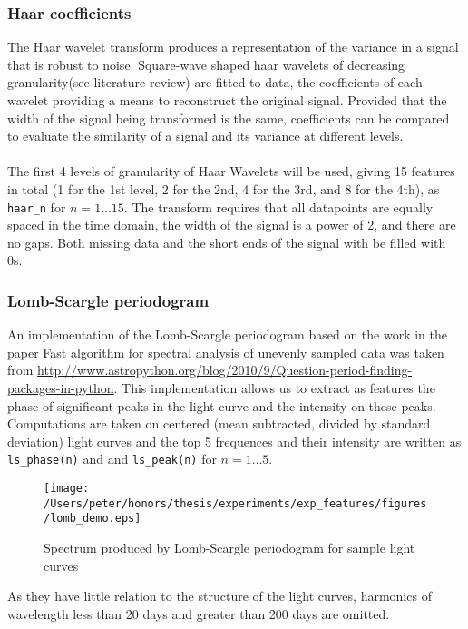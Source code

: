 	\subsubsection{Haar coefficients}
	The Haar wavelet transform produces a representation of the variance in a signal that is robust to noise. Square-wave shaped haar wavelets of decreasing granularity(see literature review) are fitted to data, the coefficients of each wavelet providing a means to reconstruct the original signal. Provided that the width of the signal being transformed is the same, coefficients can be compared to evaluate the similarity of a signal and its variance at different levels. \\ \\ %
	The first 4 levels of granularity of Haar Wavelets will be used, giving 15 features in total (1 for the 1st level, 2 for the 2nd, 4 for the 3rd, and 8 for the 4th), as \verb#haar_n# for $n = 1 \ldots 15$. The transform requires that all datapoints are equally spaced in the time domain, the width of the signal is a power of 2, and there are no gaps. Both missing data and the short ends of the signal with be filled with 0s.
	
	\subsubsection{Lomb-Scargle periodogram}
	An implementation of the Lomb-Scargle periodogram based on the work in the paper \href{http://adsabs.harvard.edu/abs/1989ApJ...338..277P}{Fast algorithm for spectral analysis of unevenly sampled data} was taken from \url{http://www.astropython.org/blog/2010/9/Question-period-finding-packages-in-python}. This implementation allows us to extract as features the phase of significant peaks in the light curve and the intensity on these peaks. Computations are taken on centered (mean subtracted, divided by standard deviation) light curves and the top 5 frequences and their intensity are written as \verb#ls_phase(n)# and and \verb#ls_peak(n)# for $n = 1\ldots 5$. \\ %
	\begin{figure}[ht!]
		\label{fig:lsspectrum}
		\texttt{[image: /Users/peter/honors/thesis/experiments/exp\_features/figures/lomb\_demo.eps]}
		\caption{Spectrum produced by Lomb-Scargle periodogram for sample light curves}
	\end{figure}
	
	As they have little relation to the structure of the light curves, harmonics of wavelength less than 20 days and greater than 200 days are omitted.
	

